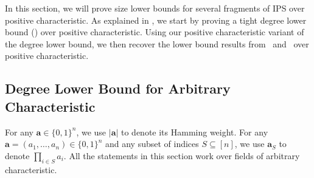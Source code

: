 \documentclass[11pt]{article}
\newcommand{\Boo}{\{0,1 \}}
\newcommand{\comment}[2]{\marginpar{\tiny{\textbf{#1: }\textit{#2}}}}
\newcommand{\nl}[1]{\comment{NL}{#1}}
\begin{document}


In this section, we will prove size lower bounds for several fragments of IPS over positive characteristic. As explained in , we start by proving a tight degree lower bound () over positive characteristic. Using our positive characteristic variant of the degree lower bound, we then recover the lower bound results from~\cite{FSTW21} and~\cite{GHT} over positive characteristic. 

\subsection{Degree Lower Bound for Arbitrary Characteristic}

For any $\mathbf{a} \in \Boo^n$, we use $|\mathbf{a}|$ to denote its Hamming weight.
For any $\mathbf{a} = (a_1, \dots, a_n) \in \Boo^n$ and any subset of indices $S\subseteq [n]$, we use $\mathbf{a}_S$ to denote $\prod_{i\in S}a_i$.
All the statements in this section work over fields of arbitrary characteristic. 
\end{document}
